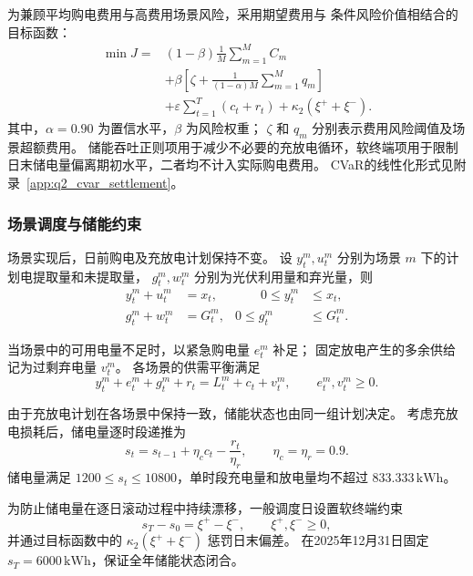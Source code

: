 为兼顾平均购电费用与高费用场景风险，采用期望费用与
条件风险价值相结合的目标函数\cite{ref4}：
\begin{equation}
\begin{aligned}
\min J
={}&
(1-\beta)\frac{1}{M}\sum_{m=1}^{M}C_m\\
&+\beta\left[
\zeta+
\frac{1}{(1-\alpha)M}
\sum_{m=1}^{M}q_m
\right]\\
&+\varepsilon\sum_{t=1}^{T}(c_t+r_t)
+\kappa_2(\xi^++\xi^-).
\end{aligned}
\label{eq:q2_objective}
\end{equation}
其中，$\alpha=0.90$ 为置信水平，$\beta$ 为风险权重；
$\zeta$ 和 $q_m$ 分别表示费用风险阈值及场景超额费用。
储能吞吐正则项用于减少不必要的充放电循环，软终端项用于限制
日末储电量偏离期初水平，二者均不计入实际购电费用。
CVaR的线性化形式见附录~\ref{app:q2_cvar_settlement}。

\subsubsection{场景调度与储能约束}

场景实现后，日前购电及充放电计划保持不变。
设 $y_t^m,u_t^m$ 分别为场景 $m$ 下的计划电提取量和未提取量，
$g_t^m,w_t^m$ 分别为光伏利用量和弃光量，则
\begin{equation}
\begin{aligned}
y_t^m+u_t^m &= x_t,
&\qquad 0\leq y_t^m &\leq x_t,\\
g_t^m+w_t^m &= G_t^m,
&0\leq g_t^m &\leq G_t^m .
\end{aligned}
\label{eq:q2_energy_allocation}
\end{equation}

当场景中的可用电量不足时，以紧急购电量 $e_t^m$ 补足；
固定放电产生的多余供给记为过剩弃电量 $v_t^m$。
各场景的供需平衡满足
\begin{equation}
y_t^m+e_t^m+g_t^m+r_t
=
L_t^m+c_t+v_t^m,
\qquad e_t^m,v_t^m\geq0 .
\label{eq:q2_scenario_balance}
\end{equation}

由于充放电计划在各场景中保持一致，储能状态也由同一组计划决定。
考虑充放电损耗后，储电量逐时段递推为
\begin{equation}
s_t
=
s_{t-1}
+\eta_c c_t
-\frac{r_t}{\eta_r},
\qquad
\eta_c=\eta_r=0.9 .
\label{eq:q2_storage_transition}
\end{equation}
储电量满足 $1200\leq s_t\leq10800$，单时段充电量和放电量均不超过
$833.333\,\mathrm{kWh}$。

为防止储电量在逐日滚动过程中持续漂移，一般调度日设置软终端约束
\begin{equation}
s_T-s_0=\xi^+-\xi^-,
\qquad
\xi^+,\xi^-\geq0 ,
\label{eq:q2_soft_terminal}
\end{equation}
并通过目标函数中的 $\kappa_2(\xi^++\xi^-)$ 惩罚日末偏差。
在2025年12月31日固定
$s_T=6000\,\mathrm{kWh}$，保证全年储能状态闭合。

